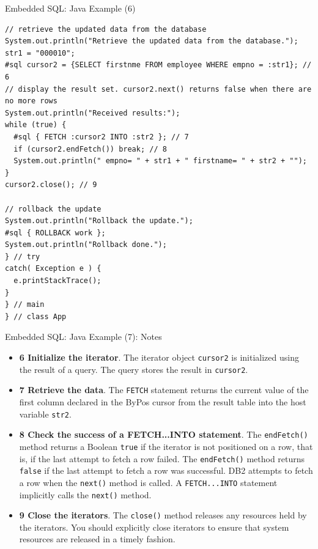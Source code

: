 \documentclass[aspectratio=169, xcolor=dvipsnames]{beamer}
\begin{document}
\begin{frame}[fragile]{Embedded SQL: Java Example (6)}
    \begin{verbatim}
// retrieve the updated data from the database
System.out.println("Retrieve the updated data from the database.");
str1 = "000010";
#sql cursor2 = {SELECT firstnme FROM employee WHERE empno = :str1}; // 6
// display the result set. cursor2.next() returns false when there are no more rows
System.out.println("Received results:");
while (true) {
  #sql { FETCH :cursor2 INTO :str2 }; // 7
  if (cursor2.endFetch()) break; // 8
  System.out.println(" empno= " + str1 + " firstname= " + str2 + "");
}
cursor2.close(); // 9

// rollback the update
System.out.println("Rollback the update.");
#sql { ROLLBACK work };
System.out.println("Rollback done.");
} // try
catch( Exception e ) {
  e.printStackTrace();
}
} // main
} // class App
    \end{verbatim}
\end{frame}

\begin{frame}{Embedded SQL: Java Example (7): Notes}
    \begin{itemize}
        \item \textbf{6 Initialize the iterator}. The iterator object \texttt{cursor2} is initialized using the result of a query. The query stores the result in \texttt{cursor2}.
        \item \textbf{7 Retrieve the data}. The \texttt{FETCH} statement returns the current value of the first column declared in the ByPos cursor from the result table into the host variable \texttt{str2}.
        \item \textbf{8 Check the success of a FETCH...INTO statement}. The \texttt{endFetch()} method returns a Boolean \texttt{true} if the iterator is not positioned on a row, that is, if the last attempt to fetch a row failed. The \texttt{endFetch()} method returns \texttt{false} if the last attempt to fetch a row was successful. DB2 attempts to fetch a row when the \texttt{next()} method is called. A \texttt{FETCH...INTO} statement implicitly calls the \texttt{next()} method.
        \item \textbf{9 Close the iterators}. The \texttt{close()} method releases any resources held by the iterators. You should explicitly close iterators to ensure that system resources are released in a timely fashion.
    \end{itemize}
\end{frame}
\end{document}
